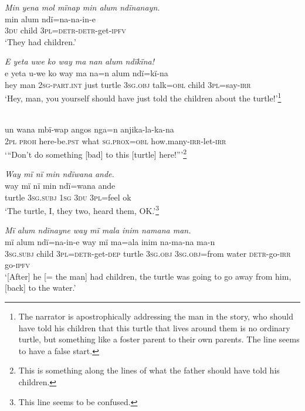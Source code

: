 \ex \negmedspace \textit{M}{\textit{i}}\textit{n}{ }\textit{yena mol m}{\textit{ï}}\textit{nap min alum ndïnan}{\textit{ayn.}}\\
\gll min  alum  ndï{=}na{{}-}na{{}-i}n{{}-}e\\
3\textsc{du}  child  3\textsc{pl}=\textsc{detr-detr-}get-\textsc{ipfv}\\
\glt ‘They had children.’

\ex \negmedspace \textit{E yeta uwe ko way ma na}{\textit{n}} \textit{alum ndïkïna!}\\
\gll e  yeta  {u-}we      ko  way  ma na{=n} alum ndï{=}kï-na\\
hey  man  2\textsc{sg-part.int}  just  turtle  3\textsc{sg.obj}  talk=\textsc{obl}  child 3\textsc{pl}=say-\textsc{irr}\\
\glt ‘Hey, man, you yourself should have {just told the children about the turtle}!’\footnote{The narrator is  apostrophically addressing the man in the story, who should have told his children that this turtle that lives around them is no ordinary turtle, but something like a foster parent to their own parents. The line seems to have a false start.}

\ex {}\\
\gll u{n} wana  mbï{{}-wa}p     angos     {n}ga=n    anjika-la-{ka-na}\\
2\textsc{pl}  \textsc{proh}  here-be.\textsc{pst}  what    \textsc{sg.prox=obl}  how.many-\textsc{irr}{}-let-\textsc{irr}\\
\glt ‘“Don’t do something [bad] to this [turtle] here!”’\footnote{This is something along the lines of what the father should have told his children.}

\ex \negmedspace \textit{Way mï nï min ndïwa}{\textit{na}} \textit{ande.}\\
\gll way   mï       nï   min     ndï{=}wa{na} ande\\
turtle  3\textsc{sg.subj}  1\textsc{sg}  3\textsc{du}  3\textsc{pl}=feel  ok\\
\glt ‘The turtle, I, they two, heard them, OK.’\footnote{This line seems to be confused.}

\newpage

\ex \negmedspace \textit{Mï alum ndï}{\textit{nayne}} \textit{way mï mala inim namana man.}\\
\gll mï      alum  ndï{=na-in-e} way   mï       ma=ala inim  na{{}-}ma{{}-}na   ma{{}-}n\\
3\textsc{sg.subj}  child  3\textsc{pl=detr-}get\textsc{{}-dep} turtle  3\textsc{sg.obj}  3\textsc{sg.obj=}from water  \textsc{detr-}go-\textsc{irr}  go-\textsc{ipfv}\\
\glt ‘[After] he [= {the man]} had children, the turtle {was going to go away from him, [back] to the water.}’

